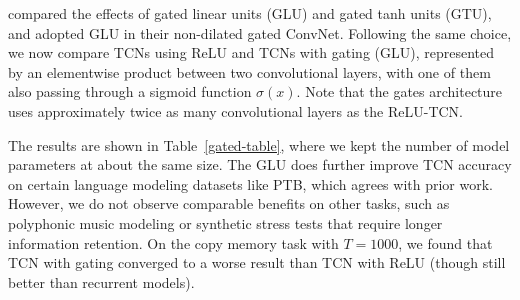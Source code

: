 \documentclass{article}
\begin{document}
\citet{dauphinGatedConv} compared the effects of gated linear units (GLU) and gated tanh units (GTU),
and adopted GLU in their non-dilated gated ConvNet. Following the same choice, we now compare TCNs using ReLU and TCNs with gating (GLU), represented by an elementwise product between two convolutional layers, with one of them
also passing through a sigmoid function $\sigma(x)$. Note that the gates architecture uses approximately twice as many convolutional layers as the  ReLU-TCN.

The results are shown in Table~\ref{gated-table}, where we kept the number of model
parameters at about the same size. The GLU does further
improve TCN accuracy on certain language modeling datasets like PTB, which agrees
with prior work. However, we do not observe comparable benefits on other tasks, such
as polyphonic music modeling or synthetic stress tests that require
longer information retention. On the copy memory task with $T=1000$, we found
that TCN with gating converged to a worse result than
TCN with ReLU (though still better than recurrent models).



\newpage
\end{document}
